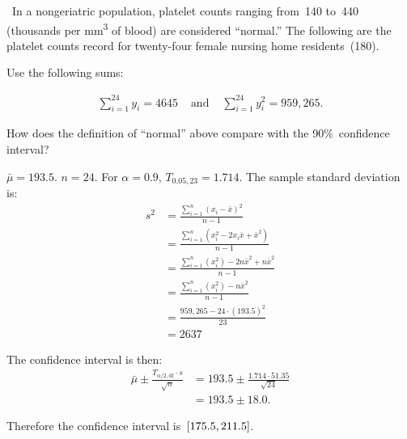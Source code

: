 \begin{problem}
  ~In a nongeriatric population, platelet counts ranging from~140 to~440 (thousands per mm\textsuperscript{3} of blood) are considered ``normal.'' The following are the platelet counts record for twenty-four female nursing home residents~(180).

  Use the following sums:

  \begin{align}
    \sum_{i=1}^{24} y_i = 4645 &\text{ and }  &\sum_{i=1}^{24} y_i^{2} = 959,265 \text{.}
  \end{align}

  How does the definition of ``normal'' above compare with the 90\%~confidence interval?
\end{problem}

${\bar{\mu} = 193.5}$. ${n = 24}$.  For ${\alpha = 0.9}$, ${T_{0.05,23} = 1.714}$. The sample standard deviation is:
\begin{align}
  s^{2} &= \frac{\sum_{i=1}^{n} \left(x_i - \bar{x}\right)^2}{n-1} \\
        &= \frac{\sum_{i=1}^{n} \left(x^2_{i} - 2x_i \bar{x} + \bar{x}^2\right)}{n-1} \\
        &= \frac{\sum_{i=1}^{n} \left(x^2_{i}\right) - 2n\bar{x}^2 + n\bar{x}^2}{n-1} \\
        &= \frac{\sum_{i=1}^{n} \left(x^2_{i}\right) - n\bar{x}^2}{n-1} \\
        &= \frac{959,265 - 24 \cdot \left(193.5\right)^2}{23} \\
        &= 2637
\end{align}

The confidence interval is then:
\begin{align}
  \bar{\mu} \pm \frac{T_{\alpha / 2, \text{df}} \cdot s}{\sqrt{n}} &= 193.5 \pm \frac{1.714 \cdot 51.35}{\sqrt{24}} \\
                                                            &= 193.5 \pm 18.0 \text{.}
\end{align}

Therefore the confidence interval is~$\lbrack175.5,211.5\rbrack$.
